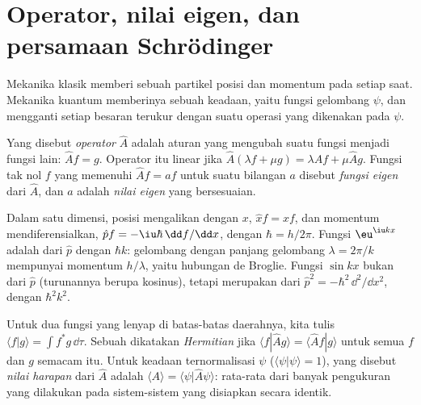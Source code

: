 \section{Operator, nilai eigen, dan persamaan Schrödinger}

Mekanika klasik memberi sebuah partikel posisi dan momentum pada setiap
saat. Mekanika kuantum memberinya sebuah keadaan, yaitu fungsi gelombang
$\psi$, dan mengganti setiap besaran terukur dengan suatu operasi yang
dikenakan pada $\psi$.

\begin{definition}\label{def:b3:quantum-model-systems:operator}
Yang disebut \emph{operator} $\hat A$ adalah aturan yang
mengubah suatu fungsi menjadi fungsi lain: $\hat A f = g$. Operator itu
linear jika $\hat A(\lambda f +
\mu g) = \lambda\hat Af + \mu\hat Ag$. Fungsi
tak nol $f$ yang memenuhi $\hat Af = a f$ untuk suatu bilangan $a$ disebut
\emph{fungsi eigen} dari $\hat A$, dan $a$ adalah
\emph{nilai eigen} yang bersesuaian.
\end{definition}

\begin{example}\label{ex:b3:quantum-model-systems:xp}
Dalam satu dimensi,  posisi mengalikan dengan $x$, $\hat x f = xf$,
dan  momentum mendiferensialkan, $\hat p f = -\iu\hbar\,
\dd f/\dd x$, dengan $\hbar = h/2\pi$. Fungsi $\eu^{\iu kx}$ adalah  dari $\hat p$ dengan  $\hbar k$: gelombang dengan panjang
gelombang $\lambda = 2\pi/k$ mempunyai momentum $h/\lambda$, yaitu hubungan
de Broglie. Fungsi $\sin kx$ bukan  dari $\hat p$ (turunannya
berupa kosinus), tetapi merupakan  dari $\hat p^2 = -\hbar^2\,\dd^2/\dd x^2$, dengan  $\hbar^2k^2$.
\end{example}

\begin{definition}\label{def:b3:quantum-model-systems:hermitian}
Untuk dua fungsi yang lenyap di batas-batas daerahnya, kita tulis
$\langle f|g\rangle = \int f^*g\,\dd\tau$. Sebuah  dikatakan
\emph{Hermitian} jika $\langle f|\hat Ag\rangle = \langle \hat Af|g\rangle$ untuk semua $f$ dan $g$ semacam itu. Untuk keadaan
ternormalisasi $\psi$ ($\langle\psi|\psi\rangle = 1$), yang disebut
\emph{nilai harapan} dari $\hat A$ adalah
$\langle A\rangle = \langle\psi|\hat A\psi\rangle$: rata-rata dari banyak
pengukuran yang dilakukan pada sistem-sistem yang disiapkan secara identik.
\end{definition}


